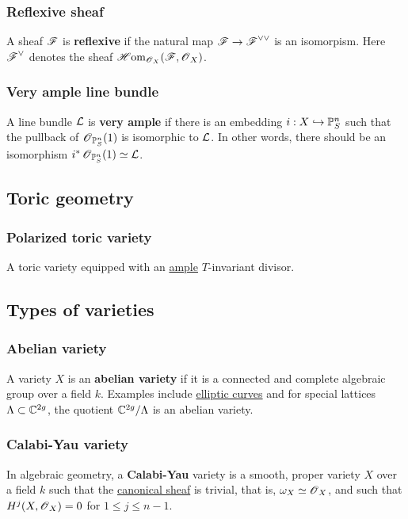 \documentclass[11pt, english]{article}
\begin{document}
\subsubsection{Reflexive sheaf}
\label{reflexivesheaf}

A sheaf $\operatorname{\mathscr{F}}$ is \textbf{reflexive} if the natural map $\operatorname{\mathscr{F}} \to \operatorname{\mathscr{F}}^{\vee\vee}$ is an isomorpism. Here $\operatorname{\mathscr{F}}^\vee$ denotes the sheaf $\operatorname{\mathscr{H}om}_{\operatorname{\mathscr{O}}_X}(\operatorname{\mathscr{F}},\operatorname{\mathscr{O}}_X)$.

\subsubsection{Very ample line bundle}
\label{veryample}
A line bundle $\mathcal{L}$ is \textbf{very ample} if there is an embedding $i:X \hookrightarrow \mathbb{P}_S^n$ such that the pullback of $\operatorname{\mathscr{O}}_{\mathbb{P}_S^n}(1)$ is isomorphic to $\mathcal{L}$. In other words, there should be an isomorphism $i^\ast \operatorname{\mathscr{O}}_{\mathbb{P}^n_S}(1) \simeq \mathcal{L}$.

\subsection{Toric geometry}
\subsubsection{Polarized toric variety}
A toric variety equipped with an \hyperref[amplelinebundle]{ample} $T$-invariant divisor.

\subsection{Types of varieties}
\subsubsection{Abelian variety}
\label{abelianvar}

A variety $X$ is an \textbf{abelian variety} if it is a connected and complete algebraic group over a field $k$. Examples include \hyperref[ellipticc]{elliptic curves} and for special lattices $\Lambda \subset \mathbb{C}^{2g}$, the quotient $\mathbb{C}^{2g}/\Lambda$ is an abelian variety.

\subsubsection{Calabi-Yau variety}

In algebraic geometry, a \textbf{Calabi-Yau} variety is a smooth, proper variety $X$ over a field $k$ such that the \hyperref[canonicaldivisor]{canonical sheaf} is trivial, that is, $\omega_X \simeq \operatorname{\mathscr{O}}_X$, and such that $H^j(X,\operatorname{\mathscr{O}}_X)=0$ for $1 \leq j \leq n-1$. 
\end{document}
